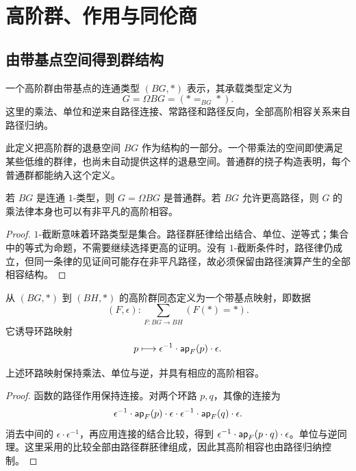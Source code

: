 \chapter{高阶群、作用与同伦商}
\section{由带基点空间得到群结构}
\begin{definition}[高阶群]
一个高阶群由带基点的连通类型 $(BG,*)$ 表示，其承载类型定义为
\[
G=\Omega BG=(*=_{BG}*).
\]
这里的乘法、单位和逆来自路径连接、常路径和路径反向，全部高阶相容关系来自路径归纳。
\end{definition}
\begin{remark}
此定义把高阶群的退悬空间 $BG$ 作为结构的一部分。一个带乘法的空间即使满足某些低维的群律，也尚未自动提供这样的退悬空间。普通群的挠子构造表明，每个普通群都能纳入这个定义。
\end{remark}
\begin{proposition}[普通群所在的层次]
若 $BG$ 是连通 $1$-类型，则 $G=\Omega BG$ 是普通群。若 $BG$ 允许更高路径，则 $G$ 的乘法律本身也可以有非平凡的高阶相容。
\end{proposition}
\begin{proof}
$1$-截断意味着环路类型是集合。路径群胚律给出结合、单位、逆等式；集合中的等式为命题，不需要继续选择更高的证明。没有 $1$-截断条件时，路径律仍成立，但同一条律的见证间可能存在非平凡路径，故必须保留由路径演算产生的全部相容结构。
\end{proof}
\begin{definition}[高阶群同态]
从 $(BG,*)$ 到 $(BH,*)$ 的高阶群同态定义为一个带基点映射，即数据
\[
(F,\epsilon):\sum_{F:BG\to BH}(F(*)=*).
\]
它诱导环路映射
\[
p\longmapsto\epsilon^{-1}\cdot\mathsf{ap}_F(p)\cdot\epsilon.
\]
\end{definition}
\begin{proposition}
上述环路映射保持乘法、单位与逆，并具有相应的高阶相容。
\end{proposition}
\begin{proof}
函数的路径作用保持连接。对两个环路 $p,q$，其像的连接为
\[
\epsilon^{-1}\cdot\mathsf{ap}_F(p)\cdot\epsilon
\cdot\epsilon^{-1}\cdot\mathsf{ap}_F(q)\cdot\epsilon.
\]
消去中间的 $\epsilon\cdot\epsilon^{-1}$，再应用连接的结合比较，得到 $\epsilon^{-1}\cdot\mathsf{ap}_F(p\cdot q)\cdot\epsilon$。单位与逆同理。这里采用的比较全部由路径群胚律组成，因此其高阶相容也由路径归纳控制。
\end{proof}

